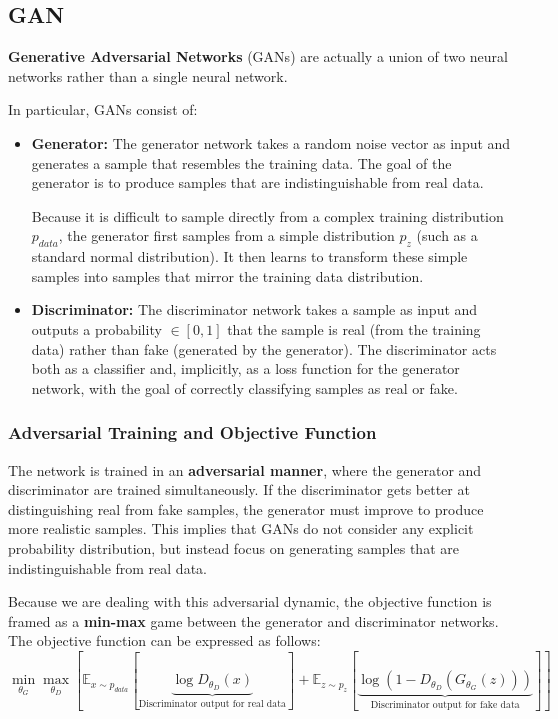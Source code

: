 \subsection{GAN}
\textbf{Generative Adversarial Networks} (GANs) are actually a union of two neural networks rather than a single neural network.

In particular, GANs consist of:

\begin{itemize}
    \item \textbf{Generator:} The generator network takes a random noise vector as input and generates a sample that resembles the training data. 
    The goal of the generator is to produce samples that are indistinguishable from real data. 
    
    Because it is difficult to sample directly from a complex training distribution $p_{data}$, 
    the generator first samples from a simple distribution $p_{z}$ (such as a standard normal distribution). 
    It then learns to transform these simple samples into samples that mirror the training data distribution.
    
    \item \textbf{Discriminator:} The discriminator network takes a sample as input and outputs a probability $\in [0,1]$ 
    that the sample is real (from the training data) rather than fake (generated by the generator). 
    The discriminator acts both as a classifier and, implicitly, as a loss function for the generator network, with the goal of correctly classifying samples as real or fake.
\end{itemize}

\subsubsection{Adversarial Training and Objective Function}
The network is trained in an \textbf{adversarial manner}, where the generator and discriminator are trained simultaneously. 
If the discriminator gets better at distinguishing real from fake samples, the generator must improve to produce more realistic samples. 
This implies that GANs do not consider any explicit probability distribution, but instead focus on generating samples that are indistinguishable from real data.

Because we are dealing with this adversarial dynamic, the objective function is framed as a \textbf{min-max} game between the generator and discriminator networks. 
The objective function can be expressed as follows:
\begin{equation}
    \min_{\theta_G} \max_{\theta_D} \left[ \mathbb{E}_{x \sim p_{data}}[\underbrace{\log D_{\theta_D}(x)}_{\text{Discriminator output for real data}}] + \mathbb{E}_{z \sim p_{z}}[ \underbrace{\log(1 - D_{\theta_D}(G_{\theta_G}(z)))}_{\text{Discriminator output for fake data}}] \right]
\end{equation}

